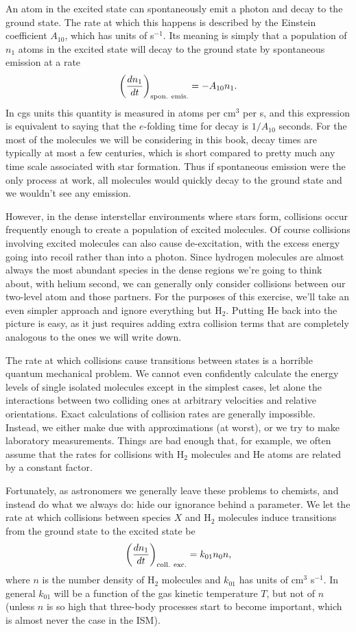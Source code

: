 An atom in the excited state can spontaneously emit a photon and decay to the ground state. The rate at which this happens is described by the Einstein coefficient $A_{10}$, which has units of s$^{-1}$. Its meaning is simply that a population of $n_1$ atoms in the excited state will decay to the ground state by spontaneous emission at a rate 
\begin{equation}
\left(\frac{dn_1}{dt}\right)_{\rm spon.~emis.} = -A_{10} n_1.
\end{equation}
In cgs units this quantity is measured in atoms per cm$^3$ per s, and this expression is equivalent to saying that the $e$-folding time for decay is $1/A_{10}$ seconds. For the most of the molecules we will be considering in this book, decay times are typically at most a few centuries, which is short compared to pretty much any time scale associated with star formation. Thus if spontaneous emission were the only process at work, all molecules would quickly decay to the ground state and we wouldn't see any emission.

However, in the dense interstellar environments where stars form, collisions occur frequently enough to create a population of excited molecules. Of course collisions involving excited molecules can also cause de-excitation, with the excess energy going into recoil rather than into a photon. Since hydrogen molecules are almost always the most abundant species in the dense regions we're going to think about, with helium second, we can generally only consider collisions between our two-level atom and those partners. For the purposes of this exercise, we'll take an even simpler approach and ignore everything but H$_2$. Putting He back into the picture is easy, as it just requires adding extra collision terms that are completely analogous to the ones we will write down.

The rate at which collisions cause transitions between states is a horrible quantum mechanical problem. We cannot even confidently calculate the energy levels of single isolated molecules except in the simplest cases, let alone the interactions between two colliding ones at arbitrary velocities and relative orientations. Exact calculations of collision rates are generally impossible. Instead, we either make due with approximations (at worst), or we try to make laboratory measurements. Things are bad enough that, for example, we often assume that the rates for collisions with H$_2$ molecules and He atoms are related by a constant factor.

Fortunately, as astronomers we generally leave these problems to chemists, and instead do what we always do: hide our ignorance behind a parameter. We let the rate at which collisions between species $X$ and H$_2$ molecules induce transitions from the ground state to the excited state be
\begin{equation}
\left(\frac{dn_1}{dt}\right)_{\rm coll.~exc.} = k_{01} n_0 n,
\end{equation}
where $n$ is the number density of H$_2$ molecules and $k_{01}$ has units of cm$^3$ s$^{-1}$. In general $k_{01}$ will be a function of the gas kinetic temperature $T$, but not of $n$ (unless $n$ is so high that three-body processes start to become important, which is almost never the case in the ISM). 


